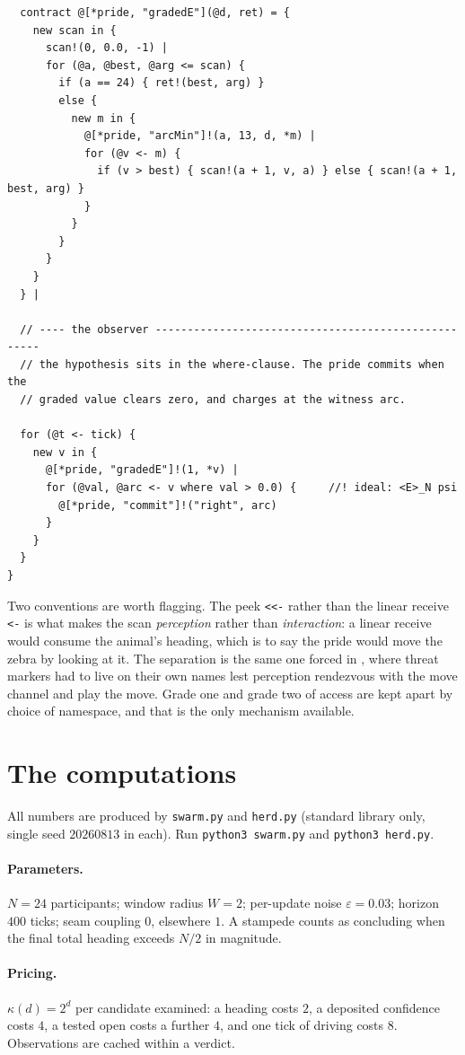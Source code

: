 \documentclass[11pt,a4paper]{article}
\theoremstyle{plain}
\theoremstyle{definition}
\theoremstyle{remark}
\begin{document}
\begin{lstlisting}
  contract @[*pride, "gradedE"](@d, ret) = {
    new scan in {
      scan!(0, 0.0, -1) |
      for (@a, @best, @arg <= scan) {
        if (a == 24) { ret!(best, arg) }
        else {
          new m in {
            @[*pride, "arcMin"]!(a, 13, d, *m) |
            for (@v <- m) {
              if (v > best) { scan!(a + 1, v, a) } else { scan!(a + 1, best, arg) }
            }
          }
        }
      }
    }
  } |

  // ---- the observer ----------------------------------------------------
  // the hypothesis sits in the where-clause. The pride commits when the
  // graded value clears zero, and charges at the witness arc.

  for (@t <- tick) {
    new v in {
      @[*pride, "gradedE"]!(1, *v) |
      for (@val, @arc <- v where val > 0.0) {     //! ideal: <E>_N psi
        @[*pride, "commit"]!("right", arc)
      }
    }
  }
}
\end{lstlisting}

Two conventions are worth flagging. The peek \texttt{<<-} rather than the
linear receive \texttt{<-} is what makes the scan \emph{perception} rather than
\emph{interaction}: a linear receive would consume the animal's heading, which
is to say the pride would move the zebra by looking at it. The separation is
the same one forced in \cite[\S4.3]{game}, where threat markers had to live on
their own names lest perception rendezvous with the move channel and play the
move. Grade one and grade two of access are kept apart by choice of namespace,
and that is the only mechanism available.

\section{The computations}\label{app:computations}

All numbers are produced by \texttt{swarm.py} and \texttt{herd.py} (standard
library only, single seed $20260813$ in each). Run \texttt{python3 swarm.py}
and \texttt{python3 herd.py}.

\paragraph{Parameters.} $N = 24$ participants; window radius $W = 2$; per-update
noise $\varepsilon = 0.03$; horizon $400$ ticks; seam coupling $0$, elsewhere
$1$. A stampede counts as concluding when the final total heading exceeds
$N/2$ in magnitude.

\paragraph{Pricing.} $\kappa(d) = 2^d$ per candidate examined: a heading costs
$2$, a deposited confidence costs $4$, a tested open costs a further $4$, and
one tick of driving costs $8$. Observations are cached within a verdict.
\end{document}
